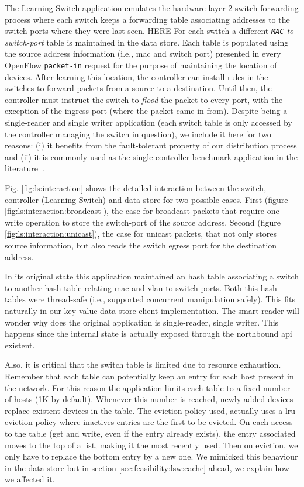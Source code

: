 The Learning Switch application emulates the hardware layer 2 switch forwarding process where each switch keeps a forwarding table associating  addresses to the switch ports where they were last seen. HERE For each switch a different \emph{\texttt{MAC}-to-switch-port} table is maintained in the data store. 
Each table is populated using the source address information (i.e., \gls{mac} and switch port)  presented in every OpenFlow \texttt{packet-in} request for the purpose of maintaining the location of devices. 
After learning this location, the controller can install rules in the switches to forward packets from a source to a destination. 
Until then, the controller must instruct the switch to \emph{flood} the packet to every port, with the exception of the ingress port (where the packet came in from).
Despite being a single-reader and single writer application (each switch table is only accessed by the controller managing the switch in question), we include it here for two reasons: (i) it benefits from the fault-tolerant property of our distribution process and (ii) it is commonly used as the single-controller benchmark application in the literature~\cite{Tootoonchian:2012uia,beacon2013}. 

Fig. \ref{fig:ls:interaction}  shows the detailed interaction between the switch, controller (Learning Switch) and data store for two possible cases. 
First (figure \ref{fig:ls:interaction:broadcast}), the case for broadcast packets that require one write operation to store the switch-port  of the source address. 
Second (figure \ref{fig:ls:interaction:unicast}),   the case for unicast packets, that not only stores source information, but also reads the switch egress port for the destination address.  

In its original state this application maintained an hash table
associating a switch to another hash table relating  \gls{mac} and
\gls{vlan} to switch ports. Both this hash tables were thread-safe
(i.e., supported concurrent manipulation safely). This fits naturally
in our key-value data store client implementation. The smart reader 
will wonder why does the original application is single-reader, single
writer. This happens since the internal state is actually exposed
through the northbound \gls{api} existent.  

Also, it is critical that the switch table is limited due to resource
exhaustion. Remember that each table can potentially keep an entry for
each host present in the network. For this reason the application
limits each table to a fixed number of hosts (1K by default). Whenever
this number is reached, newly added devices replace existent
devices in the table. The eviction policy used, actually uses a
\gls{lru} eviction policy where inactives entries are the first to be
evicted. On each access to the table (get and write, even if the entry
already exists), the entry associated moves to the top of a list,
making it the most recently used. Then on eviction, we only have to replace the
bottom entry by a new one. We mimicked this behaviour in the data
store but in section \ref{sec:feasibility:lsw:cache} ahead, we explain
how we affected it. 

